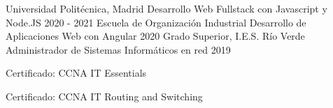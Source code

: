
\begin{cventries}
    \cventry
    {Universidad Politécnica, Madrid}
    {Desarrollo Web Fullstack con Javascript y Node.JS}
    {}
    {2020 - 2021}
    {}
    \vspace{-0.5em}
    \cventry
    {Escuela de Organización Industrial}
    {Desarrollo de Aplicaciones Web con Angular}
    {}
    {2020}
    {}
    \vspace{-0.5em}
    \cventry
    {Grado Superior, I.E.S. Río Verde}
    {Administrador de Sistemas Informáticos en red}
    {}
    {2019}
    {
        \begin{cvitems}
            \item{Certificado: CCNA IT Essentials}
            \item{Certificado: CCNA IT Routing and Switching}            
        \end{cvitems}
    }
\end{cventries}